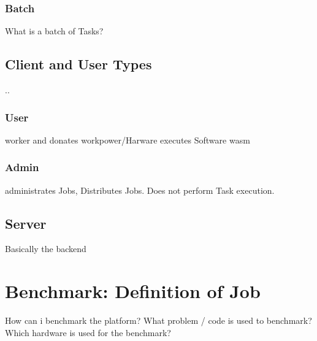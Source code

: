 \subsubsection{Batch}
\label{ssubsec:methodology:entities:task:batch}
What is a batch of Tasks?
\subsection{Client and User Types}
\label{subsec:methodology:entities:client}
..
\subsubsection{User}
\label{ssubsec:methodology:entities:client:user}
worker and donates workpower/Harware executes Software wasm
\subsubsection{Admin}
\label{ssubsec:methodology:entities:client:admin}
administrates Jobs, Distributes Jobs. Does not perform Task execution.
\subsection{Server}
\label{subsec:methodology:entities:task}
Basically the backend

\section{Benchmark: Definition of Job}
\label{sec:methodology:benchmark}
How can i benchmark the platform? What problem / code is used to benchmark? Which hardware is used for the benchmark?